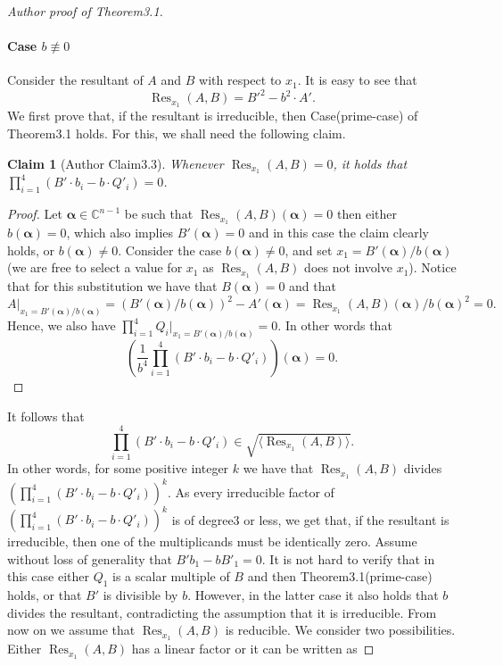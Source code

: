 \documentclass[10pt,a4paper]{article}
\newtheorem*{ntclaim}{Claim}
\begin{document}
\begin{proof}[Author proof of Theorem3.1]
\paragraph{Case $b\not\equiv0$}
Consider the resultant of $A$ and $B$ with respect to $x_1$. It is easy to see that
\[\operatorname{Res}_{x_1}(A,B)=B'^2-b^2\cdot A'.\]
We first prove that, if the resultant is irreducible, then Case(prime-case) of Theorem3.1 holds. For this, we shall need the following claim.
\begin{ntclaim}[Author Claim3.3]
Whenever $\operatorname{Res}_{x_1}(A,B)=0$, it holds that $\prod_{i=1}^4(B'\cdot b_i-b\cdot Q'_i)=0$.
\end{ntclaim}
\begin{proof}
Let $\boldsymbol\alpha\in\mathbb C^{n-1}$ be such that $\operatorname{Res}_{x_1}(A,B)(\boldsymbol\alpha)=0$ then either $b(\boldsymbol\alpha)=0$, which also implies $B'(\boldsymbol\alpha)=0$ and in this case the claim clearly holds, or $b(\boldsymbol\alpha)\ne0$. Consider the case $b(\boldsymbol\alpha)\ne0$, and set $x_1=B'(\boldsymbol\alpha)/b(\boldsymbol\alpha)$ (we are free to select a value for $x_1$ as $\operatorname{Res}_{x_1}(A,B)$ does not involve $x_1$). Notice that for this substitution we have that $B(\boldsymbol\alpha)=0$ and that
\[A|_{x_1=B'(\boldsymbol\alpha)/b(\boldsymbol\alpha)}=(B'(\boldsymbol\alpha)/b(\boldsymbol\alpha))^2-A'(\boldsymbol\alpha)=\operatorname{Res}_{x_1}(A,B)(\boldsymbol\alpha)/b(\boldsymbol\alpha)^2=0.\]
Hence, we also have $\prod_{i=1}^4Q_i|_{x_1=B'(\boldsymbol\alpha)/b(\boldsymbol\alpha)}=0$. In other words that
\[\left(\frac1{b^4}\prod_{i=1}^4(B'\cdot b_i-b\cdot Q'_i)\right)(\boldsymbol\alpha)=0.\]
\end{proof}
It follows that
\[\prod_{i=1}^4(B'\cdot b_i-b\cdot Q'_i)\in\sqrt{\langle\operatorname{Res}_{x_1}(A,B)\rangle}.\]
In other words, for some positive integer $k$ we have that $\operatorname{Res}_{x_1}(A,B)$ divides $\left(\prod_{i=1}^4(B'\cdot b_i-b\cdot Q'_i)\right)^k$. As every irreducible factor of $\left(\prod_{i=1}^4(B'\cdot b_i-b\cdot Q'_i)\right)^k$ is of degree3 or less, we get that, if the resultant is irreducible, then one of the multiplicands must be identically zero. Assume without loss of generality that $B'b_1-bB'_1=0$. It is not hard to verify that in this case either $Q_1$ is a scalar multiple of $B$ and then Theorem3.1(prime-case) holds, or that $B'$ is divisible by $b$. However, in the latter case it also holds that $b$ divides the resultant, contradicting the assumption that it is irreducible.
From now on we assume that $\operatorname{Res}_{x_1}(A,B)$ is reducible. We consider two possibilities. Either $\operatorname{Res}_{x_1}(A,B)$ has a linear factor or it can be written as

\end{proof}
\end{document}
